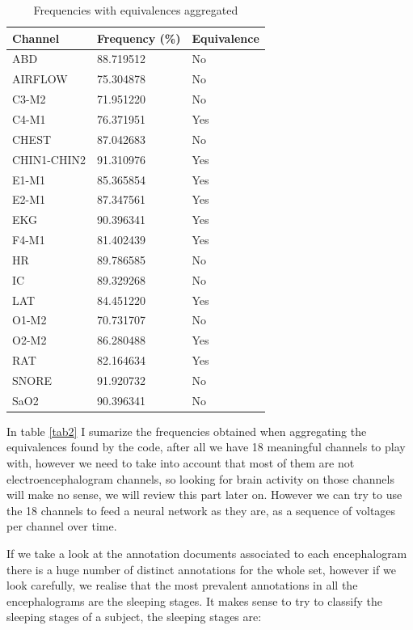 \begin{minipage}{0.45\textwidth}
\begin{table}[H]
\begin{center}
\begin{tabular}{ |p{3cm}||p{3cm}||p{3cm}| }
 \hline
 Channel & Frequency (\%) & Equivalence\\
 \hline
 ABD & 88.719512 & No \\ 
 AIRFLOW & 75.304878 & No \\  
 C3-M2 & 71.951220 & No \\
 C4-M1 & 76.371951 & Yes \\
 CHEST & 87.042683 & No \\
 CHIN1-CHIN2 & 91.310976 & Yes \\
 E1-M1 & 85.365854 & Yes \\
 E2-M1 & 87.347561 & Yes \\
 EKG & 90.396341 & Yes \\
 F4-M1 & 81.402439 & Yes \\
 HR & 89.786585 & No \\
 IC & 89.329268 & No \\
 LAT & 84.451220 & Yes \\
 O1-M2 & 70.731707 & No \\
 O2-M2 & 86.280488 & Yes \\
 RAT & 82.164634 & Yes \\
 SNORE & 91.920732 & No \\
 SaO2 & 90.396341 & No \\
 \hline
\end{tabular}
\end{center}
\caption{Frequencies with equivalences aggregated}
\label{tab2}
\end{table}
\end{minipage}%
\restoregeometry

In table \autoref{tab2} I sumarize the frequencies obtained when aggregating the equivalences found by the code, after all we have 18 meaningful channels to play with, however we need to take into account that most of them are not electroencephalogram channels, so looking for brain activity on those channels will make no sense, we will review this part later on. However we can try to use the 18 channels to feed a neural network as they are, as a sequence of voltages per channel over time. 

If we take a look at the annotation documents associated to each encephalogram there is a huge number of distinct annotations for the whole set, however if we look carefully, we realise that the most prevalent annotations in all the encephalograms are the sleeping stages. It makes sense to try to classify the sleeping stages of a subject, the sleeping stages are:

